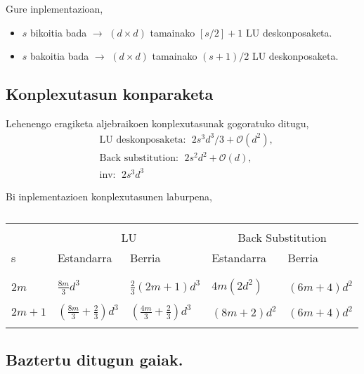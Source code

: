 Gure inplementazioan,
\begin{itemize}
\item $s$ bikoitia bada $\rightarrow$ $(d \times d)$ tamainako $[s/2]+1$  LU deskonposaketa.
\item $s$ bakoitia bada $\rightarrow$ $(d \times d)$ tamainako $(s+1)/2$  LU deskonposaketa.
\end{itemize}

\subsection*{Konplexutasun konparaketa}

Lehenengo eragiketa aljebraikoen konplexutasunak gogoratuko ditugu,
\begin{align*}
&\text{LU deskonposaketa}:  \ \ 2s^3d^3/3+\mathcal{O}(d^2), \\
&\text{Back substitution}:  \ \ 2s^2d^2+\mathcal{O}(d), \\
&\text{inv}: \ \ 2s^3d^3
\end{align*}

Bi inplementazioen konplexutasunen laburpena,
\begin{table}[h!]
\caption[LU deskonposaketak] 
{\small{}}
\label{tab:Olu}       
\centering
{%
\begin{tabular}{ l l l l l } 
 \hline
\\
                 &  \multicolumn{2}{c}{LU}  & \multicolumn{2}{c}{Back Substitution}  \\
 s               & Estandarra  & Berria     &  Estandarra  &              Berria     \\
\\
 \hline
\\
 $2m$            &   $\frac{8m}{3} d^3$                              &  $\frac{2}{3} (2m+1) d^3$ 
                 &   $4m (2d^2)$      &     $(6m+4)d^2$                                             \\
 \\
 $2m+1$          &   $\left(\frac{8m}{3} + \frac{2}{3}\right) d^3$   &  $\left(\frac{4m}{3}+\frac{2}{3}\right) d^3$
                 &   $(8m+2)d^2$      &     $(6m+4)d^2$\\  
 \\  
   \hline
 \end{tabular}}
\end{table}

\subsection*{Baztertu ditugun gaiak.}

